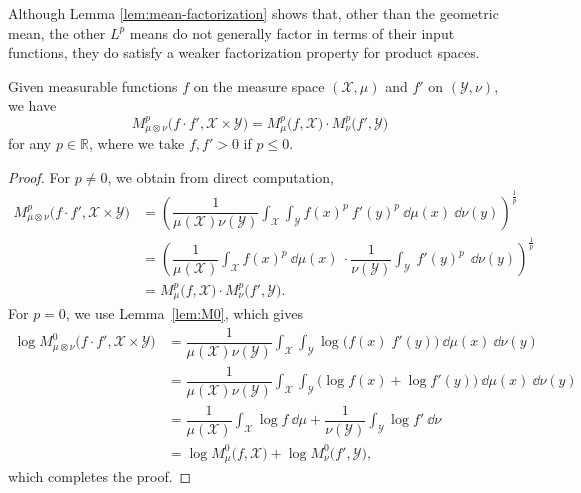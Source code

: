 \documentclass[reqno]{amsart}
\begin{document}
Although Lemma \ref{lem:mean-factorization} shows that, other than the geometric mean, the other $L^p$ means do not generally factor in terms of their input functions, they do satisfy a weaker factorization property for product spaces.
\begin{lem}
\label{lem:prod-space-mean}
    Given measurable functions $f$ on the measure space $(\mathcal{X}, \mu)$ and $f'$ on $(\mathcal{Y}, \nu)$, we have
    \begin{equation}
        \label{eq:mean-factor-product}
        M^p_{\mu \otimes \nu} \big(f \cdot f', \mathcal{X} \times \mathcal{Y} \big) = M^p_{\mu } \big(f , \mathcal{X}  \big) \cdot M^p_{\nu} \big( f',  \mathcal{Y} \big) 
    \end{equation}
    for any $p \in \mathbb{R}$, where we take $f,f'>0$ if $p\leq 0$.
\end{lem}
\begin{proof}
For $p \neq 0$, we obtain from direct computation,
\begin{align*}
    M^p_{\mu \otimes \nu} \big(f \cdot f', \mathcal{X} \times \mathcal{Y} \big) 
    &=\left( \dfrac{1}{\mu(\mathcal{X}) \nu(\mathcal{Y}) }  \int_\mathcal{X} \int_\mathcal{Y} f(x)^p ~f'(y)^p ~ \dd \mu(x) ~\dd \nu(y)   \right)^{ \frac{1}{p}} \\
    &=  \left( \dfrac{1}{\mu(\mathcal{X}) }  \int_\mathcal{X}  f(x)^p  ~ \dd \mu(x)   ~\cdot  \dfrac{1}{ \nu(\mathcal{Y}) }  \int_\mathcal{Y}  ~f'(y)^p ~  ~\dd \nu(y)   \right)^{ \frac{1}{p}} \\
     &= M^p_{\mu } \big(f , \mathcal{X}  \big) \cdot M^p_{\nu} \big( f',  \mathcal{Y} \big) .
\end{align*}
For $p = 0$, we use Lemma~\ref{lem:M0}, which gives
\begin{align*}
    \log M^0_{\mu \otimes \nu} \big(f \cdot f', \mathcal{X} \times \mathcal{Y} \big)
    &= \dfrac{1}{\mu(\mathcal{X}) \nu(\mathcal{Y}) }  \int_\mathcal{X} \int_\mathcal{Y} \log \big(f(x) \;f'(y) \big) ~ \dd \mu(x) ~\dd \nu(y)   \\
    &= \dfrac{1}{\mu(\mathcal{X}) \nu(\mathcal{Y}) }  \int_\mathcal{X} \int_\mathcal{Y} \big( \log f(x) +  \log f'(y) \big) ~ \dd \mu(x) ~\dd \nu(y)    \\
     &=   \dfrac{1}{\mu(\mathcal{X}) }  \int_\mathcal{X}  \log f  ~ \dd \mu     +   \dfrac{1}{ \nu(\mathcal{Y}) }  \int_\mathcal{Y}  \log f' ~  \dd \nu   \\
     &= \log M^0_{\mu } \big(f , \mathcal{X}  \big) + \log M^0_{\nu} \big( f',  \mathcal{Y} \big) ,
\end{align*}
which completes the proof.
\end{proof}
\end{document}
